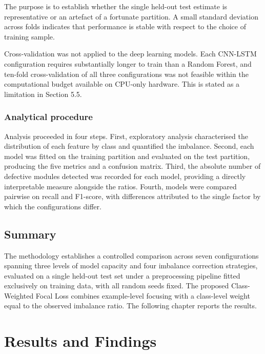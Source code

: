 \documentclass[12pt,a4paper,oneside]{report}
\begin{document}
The purpose is to establish whether the single held-out test estimate is representative or an artefact of a fortunate partition. A small standard deviation across folds indicates that performance is stable with respect to the choice of training sample.

Cross-validation was not applied to the deep learning models. Each CNN-LSTM configuration requires substantially longer to train than a Random Forest, and ten-fold cross-validation of all three configurations was not feasible within the computational budget available on CPU-only hardware. This is stated as a limitation in Section 5.5.

\subsection{Analytical procedure}

Analysis proceeded in four steps. First, exploratory analysis characterised the distribution of each feature by class and quantified the imbalance. Second, each model was fitted on the training partition and evaluated on the test partition, producing the five metrics and a confusion matrix. Third, the absolute number of defective modules detected was recorded for each model, providing a directly interpretable measure alongside the ratios. Fourth, models were compared pairwise on recall and F1-score, with differences attributed to the single factor by which the configurations differ.

\section{Summary}

The methodology establishes a controlled comparison across seven configurations spanning three levels of model capacity and four imbalance correction strategies, evaluated on a single held-out test set under a preprocessing pipeline fitted exclusively on training data, with all random seeds fixed. The proposed Class-Weighted Focal Loss combines example-level focusing with a class-level weight equal to the observed imbalance ratio. The following chapter reports the results.

\clearpage

\chapter{Results and Findings}
\end{document}
